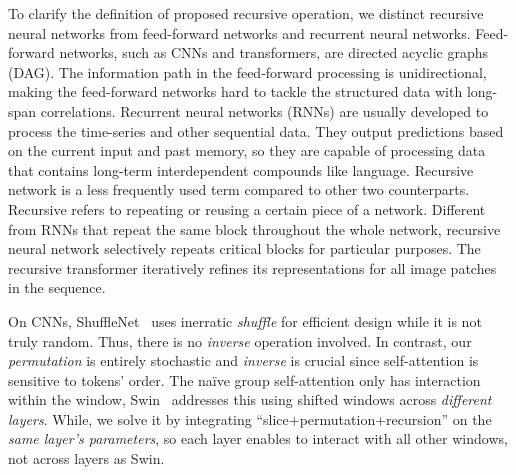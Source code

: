 \documentclass[runningheads]{llncs}
\begin{document}
	To clarify the definition of proposed recursive operation, we distinct recursive neural networks from feed-forward networks and recurrent neural networks. 
	Feed-forward networks, such as CNNs and transformers, are directed acyclic graphs (DAG). The information path in the feed-forward processing is unidirectional, making the feed-forward networks hard to tackle the structured data with long-span correlations. Recurrent neural networks (RNNs) are usually developed to process the time-series and other sequential data. They output predictions based on the current input and past memory, so they are capable of processing data that contains long-term interdependent compounds like language. Recursive network is a less frequently used term compared to other two counterparts. Recursive refers to repeating or reusing a certain piece of a network. Different from RNNs that repeat the same block throughout the whole network, recursive neural network selectively repeats critical blocks for particular purposes. The recursive transformer iteratively refines its representations for all image patches in the sequence.

	On CNNs, ShuffleNet~\cite{zhang2018shufflenet} uses inerratic {\em  shuffle} for efficient design while it is not truly random. Thus, there is no {\em inverse} operation involved. In contrast, our {\em permutation} is entirely stochastic and {\em inverse} is crucial since self-attention is sensitive to tokens' order. The na\"ive group self-attention only has interaction within the window, Swin~\cite{liu2021swin} addresses this using shifted windows across {\em different layers}. While, we solve it by integrating ``slice+permutation+recursion'' on the {\em same layer's parameters}, so each layer enables to interact with all other windows, not across layers as Swin. 

	\clearpage

	
\end{document}
